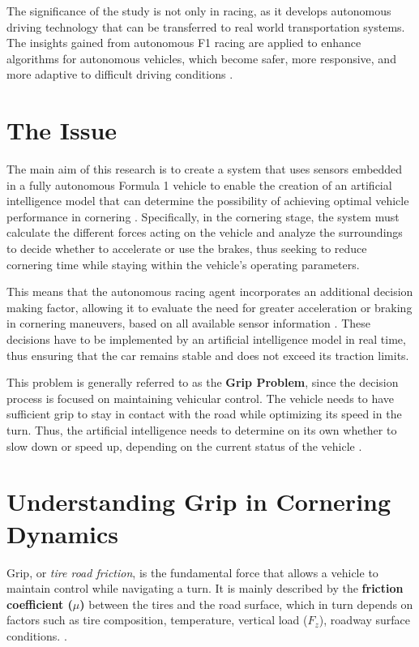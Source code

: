 \documentclass[a4paper,final,12pt]{report}
\begin{document}
The significance of the study is not only in racing, as it develops autonomous driving technology that can be transferred to real world transportation systems. The insights gained from autonomous F1 racing are applied to enhance algorithms for autonomous vehicles, which become safer, more responsive, and more adaptive to difficult driving conditions \cite{SelfDriving}.

\section{The Issue}
The main aim of this research is to create a system that uses sensors embedded in a fully autonomous Formula 1 vehicle to enable the creation of an artificial intelligence model that can determine the possibility of achieving optimal vehicle performance in cornering \cite{AI_F1}. Specifically, in the cornering stage, the system must calculate the different forces acting on the vehicle and analyze the surroundings to decide whether to accelerate or use the brakes, thus seeking to reduce cornering time while staying within the vehicle's operating parameters.

This means that the autonomous racing agent incorporates an additional decision making factor, allowing it to evaluate the need for greater acceleration or braking in cornering maneuvers, based on all available sensor information \cite{AutonomousRacing}. These decisions have to be implemented by an artificial intelligence model in real time, thus ensuring that the car remains stable and does not exceed its traction limits.

This problem is generally referred to as the \textbf{Grip Problem}, since the decision process is focused on maintaining vehicular control. The vehicle needs to have sufficient grip to stay in contact with the road while optimizing its speed in the turn. Thus, the artificial intelligence needs to determine on its own whether to slow down or speed up, depending on the current status of the vehicle \cite{SelfDriving}.

\section{Understanding Grip in Cornering Dynamics}
Grip, or \textit{tire road friction}, is the fundamental force that allows a vehicle to maintain control while navigating a turn.  It is mainly described by the \textbf{friction coefficient ($\mu$)} between the tires and the road surface, which in turn depends on factors such as tire composition, temperature, vertical load ($F_z$), roadway surface conditions. \cite{Pacejka2012}.
\end{document}
